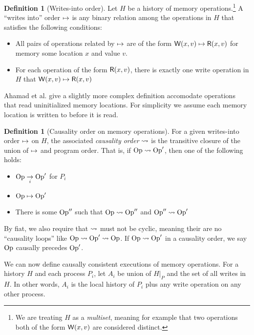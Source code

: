 \documentclass[]             %
{NASA}                       %
\theoremstyle{definition}
\newtheorem{definition}[theorem]{Definition}
\begin{document}
\begin{definition}[Writes-into order]
  Let $H$ be a history of memory operations.\footnote{We are treating $H$ as a
  \emph{multiset}, meaning for example that two operations both of the
  form $\mathsf{W}\!\left(x, v\right)$ are considered distinct.} A ``writes into''
  order $\mapsto$ is any binary relation among the operations in
  $H$ that satisfies the following conditions:
  \begin{itemize}
  \item All pairs of operations related by $\mapsto$ are of
    the form $\mathsf{W}\!\left(x, v\right) \mapsto \mathsf{R}\!\left(x, v\right)$ for
    memory some location $x$ and value $v$.
  \item For each operation of the form $\mathsf{R}\!\left(x, v\right)$, there is
    exactly one write operation in $H$ that
    $\mathsf{W}\!\left(x, v\right) \mapsto \mathsf{R}\!\left(x, v\right)$
  \end{itemize}
\end{definition}
Ahamad et al. \cite{1995:causal-memory} give a slightly more complex
definition accomodate operations that read uninitialized memory
locations. For simplicity we assume each memory location is written to
before it is read.

\begin{definition}[Causality order on memory operations]
  \label{def:memorycausalprecedence}
  For a given writes-into order $\mapsto$ on
  $H$, the associated \emph{causality order}
  $\rightsquigarrow$ is the transitive closure of the union of
  $\mapsto$ and program order. That is, if $\mathrm{Op} \rightsquigarrow
  \mathrm{Op}'$, then one of the following holds:
  \begin{itemize}
  \item $\mathrm{Op} \underset{i}{\to} \mathrm{Op}'$ for $P_i$
  \item $\mathrm{Op} \mapsto \mathrm{Op}'$
  \item There is some $\mathrm{Op}''$ such that $\mathrm{Op} \rightsquigarrow \mathrm{Op}''$ and $\mathrm{Op}'' \rightsquigarrow \mathrm{Op}'$
  \end{itemize}
  By fiat, we also require that $\rightsquigarrow$ must not be cyclic,
  meaning their are no ``causality loops'' like
  $\mathrm{Op} \rightsquigarrow \mathrm{Op}' \rightsquigarrow \mathrm{Op}$.  If
  $\mathrm{Op} \rightsquigarrow \mathrm{Op}'$ in a causality order, we say $\mathrm{Op}$
  causally precedes $\mathrm{Op}'$.
\end{definition}

We can now define causally consistent executions of memory
operations. For a history $H$ and each process $P_i$, let $A_i$ be
union of $H|_P$ and the set of all writes in $H$. In other words,
$A_i$ is the local history of $P_i$ plus any write operation on any
other process.
\end{document}
